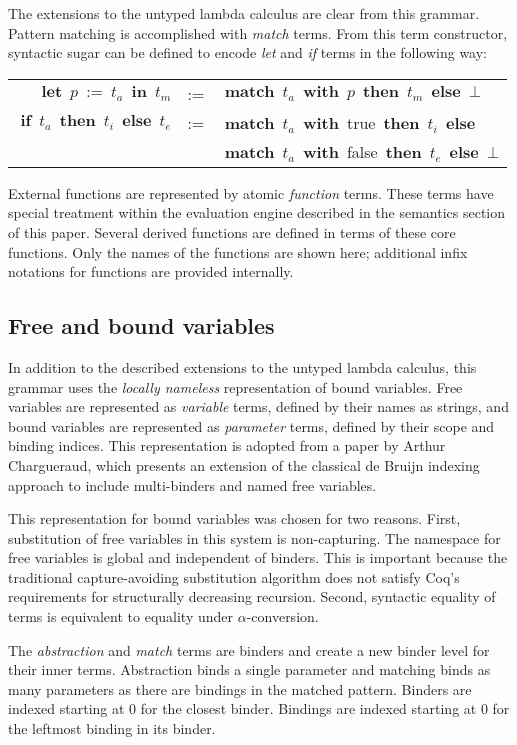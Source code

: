 \documentclass[12pt]{article}
\DeclareMathOperator{\tmatch}{\mathbf{match}}
\DeclareMathOperator{\twith}{\mathbf{with}}
\DeclareMathOperator{\tthen}{\mathbf{then}}
\DeclareMathOperator{\telse}{\mathbf{else}}
\DeclareMathOperator{\tlet}{\mathbf{let}}
\DeclareMathOperator{\tin}{\mathbf{in}}
\DeclareMathOperator{\tif}{\mathbf{if}}
\newcommand{\Match}[4]{
  \tmatch\ #1\ \twith\ #2\ \tthen\ #3\ \telse\ #4
}
\newcommand{\Let}[3]{
  \tlet\ #1\ :=\ #2\ \tin\ #3
}
\newcommand{\If}[3]{
  \tif\ #1\ \tthen\ #2\ \telse\ #3
}
\begin{document}
The extensions to the untyped lambda calculus are clear from this
grammar.  Pattern matching is accomplished with \emph{match} terms.
From this term constructor, syntactic sugar can be defined to encode
\emph{let} and \emph{if} terms in the following way:

\begin{center}
  \begin{tabular}{rcl}
    $\Let{p}{t_a}{t_m}$ & := & $\Match{t_a}{p}{t_m}{\bot}$ \\
    $\If{t_a}{t_i}{t_e}$ & := & $\Match{t_a}{$true$}{t_i}{}$ \\
      & & $\Match{t_a}{$false$}{t_e}{\bot}$
  \end{tabular}
\end{center}

External functions are represented by atomic \emph{function} terms.
These terms have special treatment within the evaluation engine
described in the semantics section of this paper.  Several derived
functions are defined in terms of these core functions.  Only the names
of the functions are shown here; additional infix notations for
functions are provided internally.

\subsection{Free and bound variables}

In addition to the described extensions to the untyped lambda calculus,
this grammar uses the \emph{locally nameless} representation of bound
variables.  Free variables are represented as \emph{variable} terms,
defined by their names as strings, and bound variables are represented
as \emph{parameter} terms, defined by their scope and binding indices.
This representation is adopted from a paper by Arthur Chargueraud, which
presents an extension of the classical de Bruijn indexing approach to
include multi-binders and named free variables.

This representation for bound variables was chosen for two reasons.
First, substitution of free variables in this system is non-capturing.
The namespace for free variables is global and independent of binders.
This is important because the traditional capture-avoiding substitution
algorithm does not satisfy Coq's requirements for structurally
decreasing recursion.  Second, syntactic equality of terms is equivalent
to equality under $\alpha$-conversion.

The \emph{abstraction} and \emph{match} terms are binders and create a
new binder level for their inner terms.  Abstraction binds a single
parameter and matching binds as many parameters as there are bindings in
the matched pattern.  Binders are indexed starting at 0 for the closest
binder. Bindings are indexed starting at 0 for the leftmost binding in
its binder.
\end{document}
